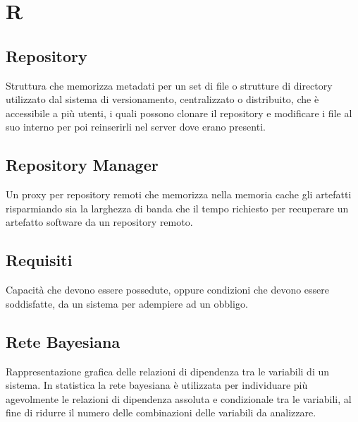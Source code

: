 \section*{R}

\subsection{Repository}
Struttura che memorizza metadati per un set di file o strutture di directory utilizzato dal sistema di versionamento, centralizzato o distribuito, che è accessibile a più utenti, i quali possono clonare il repository e modificare i file al suo interno per poi reinserirli nel server dove erano presenti.

\subsection{Repository Manager}
Un proxy per repository remoti che memorizza nella memoria cache gli artefatti risparmiando sia la larghezza di banda che il tempo richiesto per recuperare un artefatto software da un repository remoto.

\subsection{Requisiti}
Capacità che devono essere possedute, oppure condizioni che devono essere soddisfatte, da un sistema per adempiere ad un obbligo.

\subsection{Rete Bayesiana}
Rappresentazione grafica delle relazioni di dipendenza tra le variabili di un sistema. In statistica la rete bayesiana è utilizzata per individuare più agevolmente le relazioni di dipendenza assoluta e condizionale tra le variabili, al fine di ridurre il numero delle combinazioni delle variabili da analizzare.